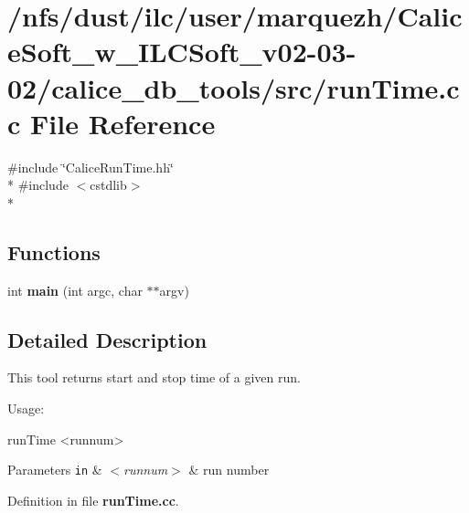 \section{/nfs/dust/ilc/user/marquezh/\-Calice\-Soft\-\_\-w\-\_\-\-I\-L\-C\-Soft\-\_\-v02-\/03-\/02/calice\-\_\-db\-\_\-tools/src/run\-Time.cc File Reference}
\label{runTime_8cc}
{\ttfamily \#include \char`\"{}Calice\-Run\-Time.\-hh\char`\"{}}\\*
{\ttfamily \#include $<$cstdlib$>$}\\*
\subsection*{Functions}
\begin{DoxyCompactItemize}
\item 
int {\bfseries main} (int argc, char $\ast$$\ast$argv)\label{runTime_8cc_a3c04138a5bfe5d72780bb7e82a18e627}

\end{DoxyCompactItemize}


\subsection{Detailed Description}
This tool returns start and stop time of a given run.

Usage\-:


\begin{DoxyCode}
runTime <runnum>
\end{DoxyCode}



\begin{DoxyParams}[1]{Parameters}
\mbox{\tt in}  & {\em $<$runnum$>$} & run number \\
\hline
\end{DoxyParams}


Definition in file {\bf run\-Time.\-cc}.

